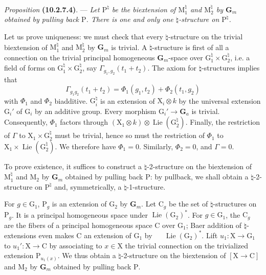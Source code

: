 \documentclass[11pt,leqno]{article}
\newcommand{\Page}[1]{\ifvmode\noindent\else\unskip\ \fi{\footnotesize\textcolor{gray}{[p.\,#1]}}\ \ignorespaces}
\begin{document}
\textit{Proposition} \textbf{(10.2.7.4)}. — \textit{Let
\(\mathrm{P}^{\natural}\) be the biextension of
\(\mathrm{M}_1^{\natural}\) and \(\mathrm{M}_2^{\natural}\) by
\(\mathbf{G}_m\) obtained by pulling back \(\mathrm{P}\). There is
one and only one \(\natural\)-structure
on \(\mathrm{P}^{\natural}\).}

Let us prove uniqueness: we must check that every
\(\natural\)-structure on the trivial biextension of
\(\mathrm{M}_1^{\natural}\) and
\(\mathrm{M}_2^{\natural}\) by \(\mathbf{G}_m\) is trivial. A \(\natural\)-structure
is first of all a connection on the trivial principal homogeneous \(\mathbf{G}_m\)-space
over \(\mathrm{G}_1^{\natural}\times\mathrm{G}_2^{\natural}\),
i.e. a field of forms on
\(\mathrm{G}_1^{\natural}\times\mathrm{G}_2^{\natural}\),
say \(\Gamma_{g_1,g_2}(t_1+t_2)\).
The axiom for \(\natural\)-structures implies that
\[
\Gamma_{g_1g_2}(t_1+t_2)
=\Phi_1(g_1,t_2)+\Phi_2(t_1,g_2)
\]
with \(\Phi_1\) and \(\Phi_2\) biadditive.
\(\mathrm{G}_i^{\natural}\) is an extension of
\(\mathrm{X}_i\otimes k\) by the universal extension
\(\mathrm{G}_i'\) of \(\mathrm{G}_i\) by an additive group.
Every morphism \(\mathrm{G}_i'\to\mathbf{G}_a\) is trivial.
Consequently, \(\Phi_1\) factors through
\((\mathrm{X}_1\otimes k)\otimes
\operatorname{Lie}(\mathrm{G}_2^{\natural})\).
Finally, the restriction of \(\Gamma\) to
\(\mathrm{X}_1\times\mathrm{G}_2^{\natural}\) must be trivial,
hence so must the restriction of \(\Phi_1\) to
\(\mathrm{X}_1\times\operatorname{Lie}(\mathrm{G}_2^{\natural})\).
We therefore have \(\Phi_1=0\). Similarly, \(\Phi_2=0\), and \(\Gamma=0\).

To prove existence, it suffices to construct a
\(\natural\)-2-structure on the biextension of
\(\mathrm{M}_1^{\natural}\) and \(\mathrm{M}_2\) by
\(\mathbf{G}_m\) obtained by pulling back \(\mathrm{P}\): by
pullback, we shall obtain a \(\natural\)-2-structure on
\(\mathrm{P}^{\natural}\) and, symmetrically, a
\(\natural\)-1-structure.

For \(g\in\mathrm{G}_1\), \(\mathrm{P}_g\) is an extension
of \(\mathrm{G}_2\) by \(\mathbf{G}_m\).
Let \(\mathrm{C}_g\) be the set of \(\natural\)-structures on
\(\mathrm{P}_g\). It is a principal homogeneous space under
\(\operatorname{Lie}(\mathrm{G}_2)^{*}\).
For \(g\in\mathrm{G}_1\), the \(\mathrm{C}_g\) are the fibers
of a principal homogeneous space \(\mathrm{C}\) over \(\mathrm{G}_1\); Baer
addition of \(\natural\)-extensions even makes \(\mathrm{C}\)
an extension of \(\mathrm{G}_1\) by
\Page{66}
\(\operatorname{Lie}(\mathrm{G}_2)^{*}\).
Lift \(u_1:\mathrm{X}\to\mathrm{G}_1\) to
\(u_1':\mathrm{X}\to\mathrm{C}\) by associating to
\(x\in\mathrm{X}\) the trivial connection on the trivialized
extension \(\mathrm{P}_{u_1(x)}\).
We thus obtain a \(\natural\)-2-structure on the biextension
of \([\mathrm{X}\to\mathrm{C}]\) and \(\mathrm{M}_2\) by
\(\mathbf{G}_m\) obtained by pulling back \(\mathrm{P}\).
\end{document}
